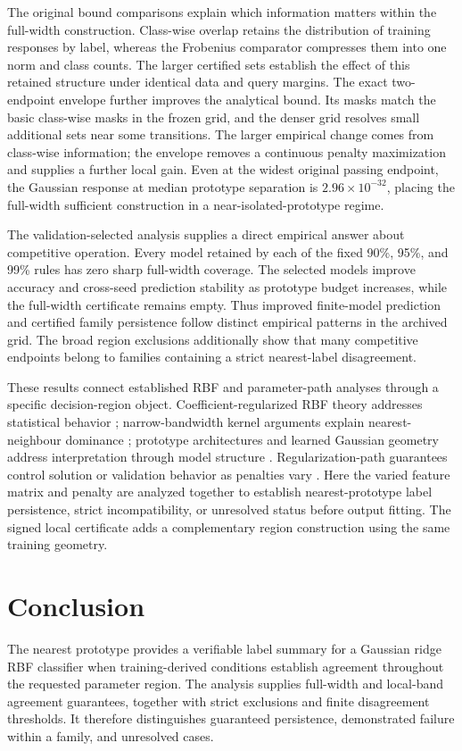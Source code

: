 \documentclass[preprint,12pt,authoryear]{elsarticle}
\begin{document}
The original bound comparisons explain which information matters within the full-width construction. Class-wise overlap retains the distribution of training responses by label, whereas the Frobenius comparator compresses them into one norm and class counts. The larger certified sets establish the effect of this retained structure under identical data and query margins. The exact two-endpoint envelope further improves the analytical bound. Its masks match the basic class-wise masks in the frozen grid, and the denser grid resolves small additional sets near some transitions. The larger empirical change comes from class-wise information; the envelope removes a continuous penalty maximization and supplies a further local gain. Even at the widest original passing endpoint, the Gaussian response at median prototype separation is $2.96\times10^{-32}$, placing the full-width sufficient construction in a near-isolated-prototype regime.

The validation-selected analysis supplies a direct empirical answer about competitive operation. Every model retained by each of the fixed 90\%, 95\%, and 99\% rules has zero sharp full-width coverage. The selected models improve accuracy and cross-seed prediction stability as prototype budget increases, while the full-width certificate remains empty. Thus improved finite-model prediction and certified family persistence follow distinct empirical patterns in the archived grid. The broad region exclusions additionally show that many competitive endpoints belong to families containing a strict nearest-label disagreement.

These results connect established RBF and parameter-path analyses through a specific decision-region object. Coefficient-regularized RBF theory addresses statistical behavior \citep{que2016}; narrow-bandwidth kernel arguments explain nearest-neighbour dominance \citep{radhakrishnan2023}; prototype architectures and learned Gaussian geometry address interpretation through model structure \citep{saralajew2025,dagostino2024}. Regularization-path guarantees control solution or validation behavior as penalties vary \citep{shibagaki2015,ndiaye2019}. Here the varied feature matrix and penalty are analyzed together to establish nearest-prototype label persistence, strict incompatibility, or unresolved status before output fitting. The signed local certificate adds a complementary region construction using the same training geometry.

\section{Conclusion}
The nearest prototype provides a verifiable label summary for a Gaussian ridge RBF classifier when training-derived conditions establish agreement throughout the requested parameter region. The analysis supplies full-width and local-band agreement guarantees, together with strict exclusions and finite disagreement thresholds. It therefore distinguishes guaranteed persistence, demonstrated failure within a family, and unresolved cases.
\end{document}

